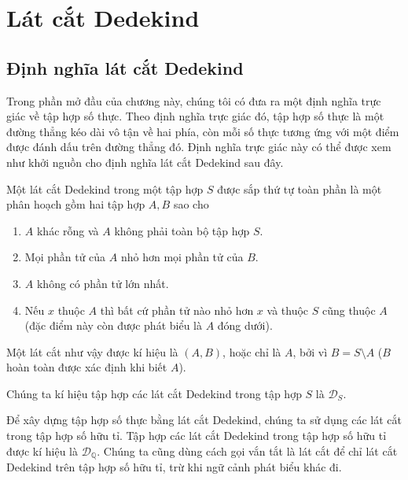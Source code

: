 \section{Lát cắt Dedekind}\label{section:dedekind-cuts}

\subsection{Định nghĩa lát cắt Dedekind}

Trong phần mở đầu của chương này, chúng tôi có đưa ra một định nghĩa trực giác về tập hợp số thực. Theo định nghĩa trực giác đó, tập hợp số thực là một đường thẳng kéo dài vô tận về hai phía, còn mỗi số thực tương ứng với một điểm được đánh dấu trên đường thẳng đó. Định nghĩa trực giác này có thể được xem như khởi nguồn cho định nghĩa lát cắt Dedekind sau đây.

\begin{definition}
    Một lát cắt Dedekind trong một tập hợp $S$ được sắp thứ tự toàn phần là một phân hoạch gồm hai tập hợp $A, B$ sao cho
    \begin{enumerate}[label={(DC\arabic*)},itemindent=0.5cm]
        \item $A$ khác rỗng và $A$ không phải toàn bộ tập hợp $S$.
        \item Mọi phần tử của $A$ nhỏ hơn mọi phần tử của $B$.
        \item $A$ không có phần tử lớn nhất.
        \item Nếu $x$ thuộc $A$ thì bất cứ phần tử nào nhỏ hơn $x$ và thuộc $S$ cũng thuộc $A$ (đặc điểm này còn được phát biểu là $A$ đóng dưới).
    \end{enumerate}

    Một lát cắt như vậy được kí hiệu là $(A, B)$, hoặc chỉ là $A$, bởi vì $B = S\setminus A$ ($B$ hoàn toàn được xác định khi biết $A$).

    Chúng ta kí hiệu tập hợp các lát cắt Dedekind trong tập hợp $S$ là $\mathscr{D}_{S}$.
\end{definition}

Để xây dựng tập hợp số thực bằng lát cắt Dedekind, chúng ta sử dụng các lát cắt trong tập hợp số hữu tỉ. Tập hợp các lát cắt Dedekind trong tập hợp số hữu tỉ được kí hiệu là $\mathscr{D}_{\mathbb{Q}}$. Chúng ta cũng dùng cách gọi vắn tắt là lát cắt để chỉ lát cắt Dedekind trên tập hợp số hữu tỉ, trừ khi ngữ cảnh phát biểu khác đi.

